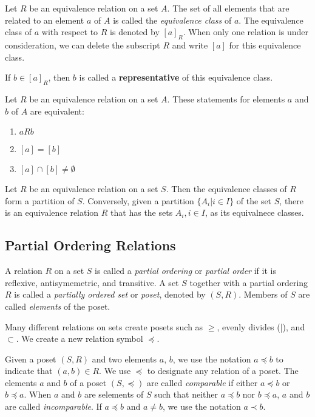 \begin{definition}
Let $R$ be an equivalence relation on a set $A$. The set of all elements that are related to an element $a$ of $A$ is called the \textit{equivalence class} of $a$. The equivalence class of $a$ with respect to $R$ is denoted by $[a]_R$. When only one relation is under consideration, we can delete the subscript $R$ and write $[a]$ for this equivalence class.

If $b \in [a]_R$, then $b$ is called a \textbf{representative} of this equivalence class.
\end{definition}


\begin{theorem}
Let $R$ be an equivalence relation on a set $A$. These statements for elements $a$ and $b$ of $A$ are equivalent:
\begin{enumerate}[label=(\roman*)]
\item
$aRb$
\item
$[a]=[b]$
\item
$[a] \cap [b] \neq \emptyset$
\end{enumerate}
\end{theorem}

\begin{theorem}
Let $R$ be an equivalence relation on a set $S$. Then the equivalence classes of $R$ form a partition of $S$. Conversely, given a partition $\{A_i | i \in I\}$ of the set $S$, there is an equivalence relation $R$ that has the sets $A_i, i \in I$, as its equivalnece classes.
\end{theorem}

    \subsection {Partial Ordering Relations}
\begin{definition}[Posets]
A relation $R$ on a set $S$ is called a \textit{partial ordering} or \textit{partial order} if it is reflexive, antisymemetric, and transitive. A set $S$ together with a partial ordering $R$ is called a \textit{partially ordered set} or \textit{poset}, denoted by $(S,R)$. Members of $S$ are called \textit{elements} of the poset.
\end{definition}

Many different relations on sets create posets such as $\ge$, evenly divides (|), and $\subset$. We create a new relation symbol $\preceq$.

\begin{definition}
Given a poset $(S,R)$ and two elements $a$, $b$, we use the notation $a \preceq b$ to indicate that $(a,b)\in R$. We use $\preceq$ to designate any relation of a poset. The elements $a$ and $b$ of a poset $(S,\preceq)$ are called \textit{comparable} if either $a\preceq b$ or $b\preceq a$. When $a$ and $b$ are selements of $S$ such that neither $a \preceq b$ nor $b \preceq a$, $a$ and $b$ are called \textit{incomparable}. If $a \preceq b$ and $a \neq b$, we use the notation $a \prec b$.
\end{definition}

